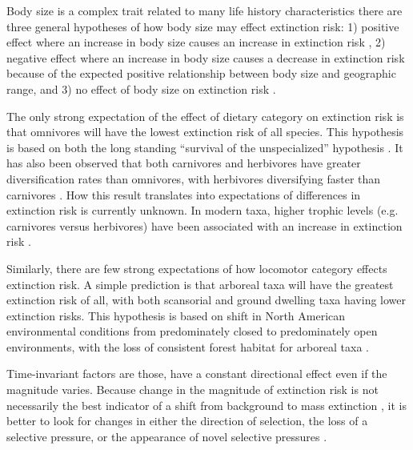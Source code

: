 \documentclass[12pt]{article}
\begin{document}
Body size is a complex trait related to many life history characteristics there are three general hypotheses of how body size may effect extinction risk: 1) positive effect where an increase in body size causes an increase in extinction risk \cite{Liow2008,Liow2009}, 2) negative effect where an increase in body size causes a decrease in extinction risk because of the expected positive relationship between body size and geographic range, and 3) no effect of body size on extinction risk \cite{Tomiya2013}. 

The only strong expectation of the effect of dietary category on extinction risk is that omnivores will have the lowest extinction risk of all species. This hypothesis is based on both the long standing ``survival of the unspecialized'' hypothesis \cite{Liow2004a,Simpson1944}. It has also been observed that both carnivores and herbivores have greater diversification rates than omnivores, with herbivores diversifying faster than carnivores \cite{Price2012}. How this result translates into expectations of differences in extinction risk is currently unknown. In modern taxa, higher trophic levels (e.g. carnivores versus herbivores) have been associated with an increase in extinction risk \cite{Liow2009,Purvis2000a}. 

Similarly, there are few strong expectations of how locomotor category effects extinction risk. A simple prediction is that arboreal taxa will have the greatest extinction risk of all, with both scansorial and ground dwelling taxa having lower extinction risks. This hypothesis is based on shift in North American environmental conditions from predominately closed to predominately open environments, with the loss of consistent forest habitat for arboreal taxa \cite{Blois2009,Janis1993a}. 

Time-invariant factors are those, have a constant directional effect even if the magnitude varies. Because change in the magnitude of extinction risk is not necessarily the best indicator of a shift from background to mass extinction \cite{Wang2003}, it is better to look for changes in either the direction of selection, the loss of a selective pressure, or the appearance of novel selective pressures \cite{Jablonski1986}.
\end{document}
